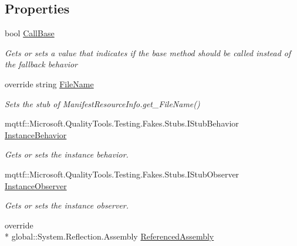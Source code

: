 \subsection*{Properties}
\begin{DoxyCompactItemize}
\item 
bool \hyperlink{class_system_1_1_reflection_1_1_fakes_1_1_stub_manifest_resource_info_a78c3c1373fac5c817f16456fa4f893b6}{Call\-Base}
\begin{DoxyCompactList}\small\item\em Gets or sets a value that indicates if the base method should be called instead of the fallback behavior\end{DoxyCompactList}\item 
override string \hyperlink{class_system_1_1_reflection_1_1_fakes_1_1_stub_manifest_resource_info_a561db7fa648e7de739a96823a07d5f7d}{File\-Name}
\begin{DoxyCompactList}\small\item\em Sets the stub of Manifest\-Resource\-Info.\-get\-\_\-\-File\-Name()\end{DoxyCompactList}\item 
mqttf\-::\-Microsoft.\-Quality\-Tools.\-Testing.\-Fakes.\-Stubs.\-I\-Stub\-Behavior \hyperlink{class_system_1_1_reflection_1_1_fakes_1_1_stub_manifest_resource_info_a541adc80ae9444b18110677e1c439473}{Instance\-Behavior}
\begin{DoxyCompactList}\small\item\em Gets or sets the instance behavior.\end{DoxyCompactList}\item 
mqttf\-::\-Microsoft.\-Quality\-Tools.\-Testing.\-Fakes.\-Stubs.\-I\-Stub\-Observer \hyperlink{class_system_1_1_reflection_1_1_fakes_1_1_stub_manifest_resource_info_a19ee16cef763ab5ef353ae02a09a9c66}{Instance\-Observer}
\begin{DoxyCompactList}\small\item\em Gets or sets the instance observer.\end{DoxyCompactList}\item 
override \\*
global\-::\-System.\-Reflection.\-Assembly \hyperlink{class_system_1_1_reflection_1_1_fakes_1_1_stub_manifest_resource_info_accd83c36a03d9f09c7dc653076f233fc}{Referenced\-Assembly}

\end{DoxyCompactItemize}
